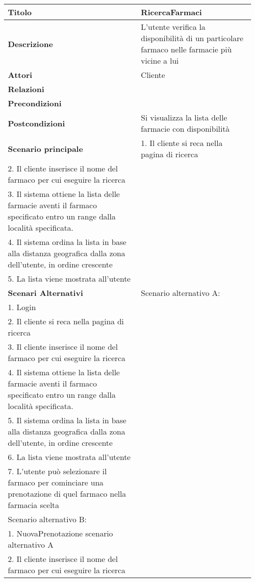 \begin{tabular} {|P{4.5cm}|P{12.5cm}|}
  \hline
    \textbf{Titolo} & RicercaFarmaci\\
  \hline
    \textbf{Descrizione} & L'utente verifica la disponibilità di un particolare farmaco nelle farmacie più vicine a lui\\
  \hline
    \textbf{Attori} & Cliente\\
  \hline
    \textbf{Relazioni} &\\
  \hline
    \textbf{Precondizioni} &\\
  \hline
    \textbf{Postcondizioni} & Si visualizza la lista delle farmacie con disponibilità\\
  \hline
    \textbf{Scenario principale} & 
      1. Il cliente si reca nella pagina di ricerca \\
      2. Il cliente inserisce il nome del farmaco per cui eseguire la ricerca \\
      3. Il sistema ottiene la lista delle farmacie aventi il farmaco specificato entro un range dalla località specificata. \\ 
      4. Il sistema ordina la lista in base alla distanza geografica dalla zona dell'utente, in ordine crescente \\
      5. La lista viene mostrata all'utente\\
  \hline
    \textbf{Scenari Alternativi} &
      Scenario alternativo A: \\
        1. Login \\ 
        2. Il cliente si reca nella pagina di ricerca \\ 
        3. Il cliente inserisce il nome del farmaco per cui eseguire la ricerca \\ 
        4. Il sistema ottiene la lista delle farmacie aventi il farmaco specificato entro un range dalla località specificata. \\ 
        5. Il sistema ordina la lista in base alla distanza geografica dalla zona dell'utente, in ordine crescente \\ 
        6. La lista viene mostrata all'utente \\ 
        7. L'utente può selezionare il farmaco per cominciare una prenotazione di quel farmaco nella farmacia scelta \\
      Scenario alternativo B: \\
        1. NuovaPrenotazione scenario alternativo A \\ 
        2. Il cliente inserisce il nome del farmaco per cui eseguire la ricerca \\ 

\end{tabular}
